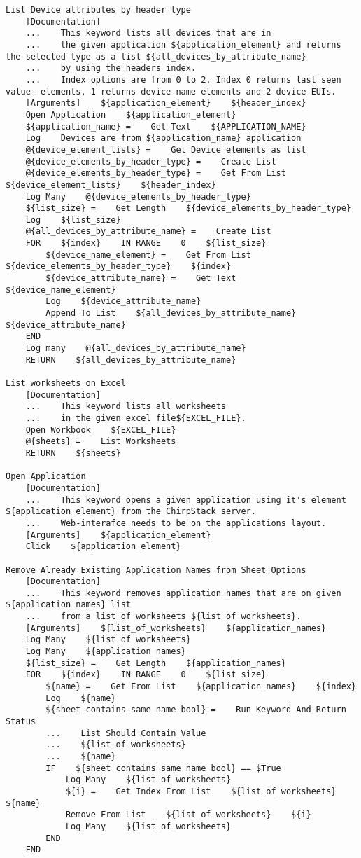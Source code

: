 \begin{verbatim}
List Device attributes by header type
    [Documentation]
    ...    This keyword lists all devices that are in
    ...    the given application ${application_element} and returns the selected type as a list ${all_devices_by_attribute_name}
    ...    by using the headers index.
    ...    Index options are from 0 to 2. Index 0 returns last seen value- elements, 1 returns device name elements and 2 device EUIs.
    [Arguments]    ${application_element}    ${header_index}
    Open Application    ${application_element}
    ${application_name} =    Get Text    ${APPLICATION_NAME}
    Log    Devices are from ${application_name} application
    @{device_element_lists} =    Get Device elements as list
    @{device_elements_by_header_type} =    Create List
    @{device_elements_by_header_type} =    Get From List    ${device_element_lists}    ${header_index}
    Log Many    @{device_elements_by_header_type}
    ${list_size} =    Get Length    ${device_elements_by_header_type}
    Log    ${list_size}
    @{all_devices_by_attribute_name} =    Create List
    FOR    ${index}    IN RANGE    0    ${list_size}
        ${device_name_element} =    Get From List    ${device_elements_by_header_type}    ${index}
        ${device_attribute_name} =    Get Text    ${device_name_element}
        Log    ${device_attribute_name}
        Append To List    ${all_devices_by_attribute_name}    ${device_attribute_name}
    END
    Log many    @{all_devices_by_attribute_name}
    RETURN    ${all_devices_by_attribute_name}

List worksheets on Excel
    [Documentation]
    ...    This keyword lists all worksheets
    ...    in the given excel file${EXCEL_FILE}.
    Open Workbook    ${EXCEL_FILE}
    @{sheets} =    List Worksheets
    RETURN    ${sheets}

Open Application
    [Documentation]
    ...    This keyword opens a given application using it's element ${application_element} from the ChirpStack server.
    ...    Web-interafce needs to be on the applications layout.
    [Arguments]    ${application_element}
    Click    ${application_element}

Remove Already Existing Application Names from Sheet Options
    [Documentation]
    ...    This keyword removes application names that are on given ${application_names} list
    ...    from a list of worksheets ${list_of_worksheets}.
    [Arguments]    ${list_of_worksheets}    ${application_names}
    Log Many    ${list_of_worksheets}
    Log Many    ${application_names}
    ${list_size} =    Get Length    ${application_names}
    FOR    ${index}    IN RANGE    0    ${list_size}
        ${name} =    Get From List    ${application_names}    ${index}
        Log    ${name}
        ${sheet_contains_same_name_bool} =    Run Keyword And Return Status
        ...    List Should Contain Value
        ...    ${list_of_worksheets}
        ...    ${name}
        IF    ${sheet_contains_same_name_bool} == $True
            Log Many    ${list_of_worksheets}
            ${i} =    Get Index From List    ${list_of_worksheets}    ${name}
            Remove From List    ${list_of_worksheets}    ${i}
            Log Many    ${list_of_worksheets}
        END
    END


\end{verbatim}

